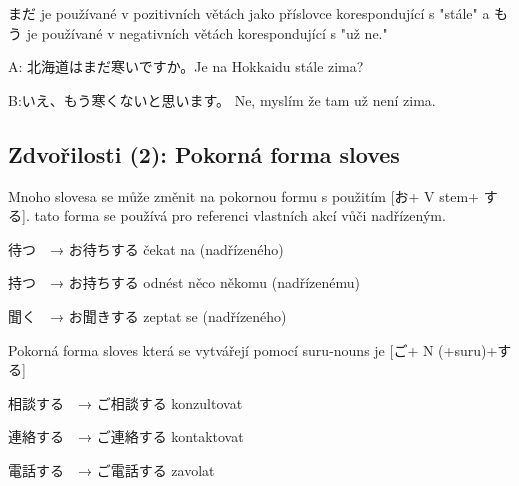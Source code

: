  まだ je používané v pozitivních větách jako příslovce korespondující s  "stále" a もう je používané v negativních větách korespondující s  "už ne."

A: 北海道はまだ寒いですか。Je na Hokkaidu stále zima?

B:いえ、もう寒くないと思います。 Ne, myslím že tam už není zima.


\subsection{Zdvořilosti (2): Pokorná forma sloves}

Mnoho slovesa se může změnit na pokornou formu s použitím [お+  V stem+ する]. tato forma se používá pro referenci vlastních akcí vůči nadřízeným. 

待つ　→    お待ちする čekat na (nadřízeného)

持つ　→    お持ちする odnést něco někomu (nadřízenému)

聞く　→    お聞きする zeptat se (nadřízeného)

Pokorná forma sloves která se vytvářejí pomocí suru-nouns je [ご+  N (+suru)+する]


相談する　→    ご相談する konzultovat

連絡する　→    ご連絡する kontaktovat

電話する　→    ご電話する zavolat
